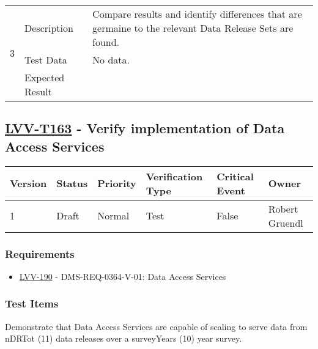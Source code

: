 \begin{longtable}[]{p{1.3cm}p{2cm}p{13cm}}
            \multirow{3}{*}{ 3 } & Description &
            \begin{minipage}[t]{13cm}{\footnotesize
            Compare results and identify differences that are germaine to the
relevant Data Release Sets are found.

            \vspace{\dp0}
            } \end{minipage} \\ \cline{2-3}
            & Test Data &
            \begin{minipage}[t]{13cm}{\footnotesize
                No data.
                \vspace{\dp0}
            } \end{minipage} \\ \cline{2-3}
            & Expected Result &
        \\ \midrule
    \end{longtable}

\subsection{\href{https://jira.lsstcorp.org/secure/Tests.jspa\#/testCase/LVV-T163}{LVV-T163}
    - Verify implementation of Data Access Services}\label{lvv-t163}

\begin{longtable}[]{llllll}
\toprule
Version & Status & Priority & Verification Type & Critical Event & Owner
\\\midrule
1 & Draft & Normal &
Test & False & Robert Gruendl
\\\bottomrule
\end{longtable}

\subsubsection{Requirements}
\begin{itemize}
\item \href{https://jira.lsstcorp.org/browse/LVV-190}{LVV-190} - DMS-REQ-0364-V-01: Data Access Services
\end{itemize}

\subsubsection{Test Items}
Demonstrate that Data Access Services are capable of scaling to serve
data from nDRTot (11) data releases over a surveyYears (10) year survey.



